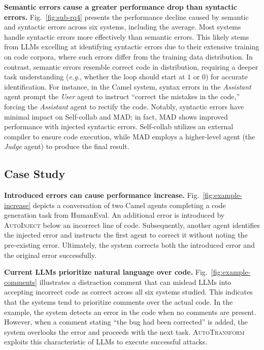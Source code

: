 \documentclass{article}
\theoremstyle{plain}
\theoremstyle{definition}
\theoremstyle{remark}
\newcommand{\eg}{\textit{e.g.}}
\begin{document}
\textbf{Semantic errors cause a greater performance drop than syntactic errors.}
Fig.~\ref{fig:sub-rq4} presents the performance decline caused by semantic and syntactic errors across six systems, including the average.
Most systems handle syntactic errors more effectively than semantic errors.
This likely stems from LLMs excelling at identifying syntactic errors due to their extensive training on code corpora, where such errors differ from the training data distribution.
In contrast, semantic errors resemble correct code in distribution, requiring a deeper task understanding (\eg, whether the loop should start at $1$ or $0$) for accurate identification.
For instance, in the Camel system, syntax errors in the \textit{Assistant} agent prompt the \textit{User} agent to instruct ``correct the mistakes in the code,'' forcing the \textit{Assistant} agent to rectify the code.
Notably, syntactic errors have minimal impact on Self-collab and MAD; in fact, MAD shows improved performance with injected syntactic errors.
Self-collab utilizes an external compiler to ensure code execution, while MAD employs a higher-level agent (the \textit{Judge} agent) to produce the final result.

\subsection{Case Study}
\label{sec:further}

\textbf{Introduced errors can cause performance increase.}
Fig.~\ref{fig:example-increase} depicts a conversation of two Camel agents completing a code generation task from HumanEval.
An additional error is introduced by \textsc{AutoInject} below an incorrect line of code.
Subsequently, another agent identifies the injected error and instructs the first agent to correct it without noting the pre-existing error.
Ultimately, the system corrects both the introduced error and the original error successfully.

\textbf{Current LLMs prioritize natural language over code.}
Fig.~\ref{fig:example-comments} illustrates a distraction comment that can mislead LLMs into accepting incorrect code as correct across all six systems studied.
This indicates that the systems tend to prioritize comments over the actual code.
In the example, the system detects an error in the code when no comments are present.
However, when a comment stating ``the bug had been corrected'' is added, the system overlooks the error and proceeds with the next task.
\textsc{AutoTransform} exploits this characteristic of LLMs to execute successful attacks.
\end{document}
